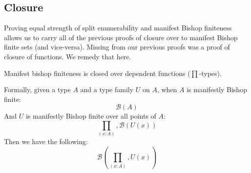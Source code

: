 \subsection{Closure}
Proving equal strength of split enumerability and manifest Bishop finiteness
allows us to carry all of the previous proofs of closure over to manifest Bishop
finite sets (and vice-versa).
Missing from our previous proofs was a proof of closure of functions.
We remedy that here.
\begin{theorem}
  Manifest bishop finiteness is closed over dependent functions (\(\prod\)-types).

  Formally, given a type \(A\) and a type family \(U\) on \(A\), when \(A\) is
  manifestly Bishop finite:
  \begin{equation}
    \mathcal{B}\left( A \right)
  \end{equation}
  And \(U\) is manifestly Bishop finite over all points of \(A\):
  \begin{equation}
    \prod_{(x : A)} , \mathcal{B}\left( U(x) \right)
  \end{equation}
  Then we have the following:
  \begin{equation}
    \mathcal{B}\left(\prod_{(x : A)} , U(x)\right)
  \end{equation}
\end{theorem}
